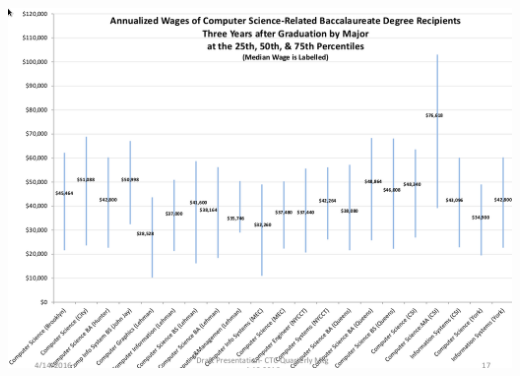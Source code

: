 \documentclass[presetation]{beamer}
\begin{document}
\begin{frame}[label={sec:orge545a99}]{}
\begin{center}
\includegraphics[width=.9\linewidth]{./images/salaryDist.png}
\end{center}
\end{frame}
\end{document}
